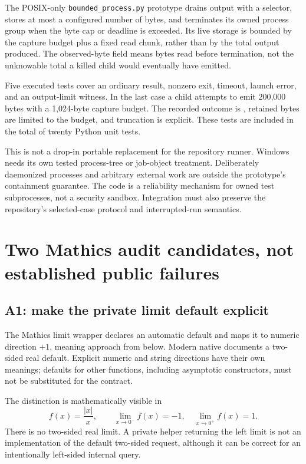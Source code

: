 \documentclass[11pt,letterpaper]{article}
\newcommand{\code}[1]{\texttt{\detokenize{#1}}}
\newcommand{\file}[1]{\nolinkurl{#1}}
\begin{document}
The POSIX-only \file{bounded_process.py} prototype drains output with a selector, stores at most a configured number of bytes, and terminates its owned process group when the byte cap or deadline is exceeded. Its live storage is bounded by the capture budget plus a fixed read chunk, rather than by the total output produced. The observed-byte field means bytes read before termination, not the unknowable total a killed child would eventually have emitted.

Five executed tests cover an ordinary result, nonzero exit, timeout, launch error, and an output-limit witness. In the last case a child attempts to emit 200,000 bytes with a 1,024-byte capture budget. The recorded outcome is \code{OutputLimit}, retained bytes are limited to the budget, and truncation is explicit. These tests are included in the total of twenty Python unit tests.

This is not a drop-in portable replacement for the repository runner. Windows needs its own tested process-tree or job-object treatment. Deliberately daemonized processes and arbitrary external work are outside the prototype's containment guarantee. The code is a reliability mechanism for owned test subprocesses, not a security sandbox. Integration must also preserve the repository's selected-case protocol and interrupted-run semantics.

\section{Two Mathics audit candidates, not established public failures}
\label{sec:audit}

\subsection{A1: make the private limit default explicit}

The Mathics limit wrapper declares an automatic default and maps it to numeric direction $+1$, meaning approach from below. Modern native \code{Limit} documents a two-sided real default. Explicit numeric and string directions have their own meanings; defaults for other functions, including asymptotic constructors, must not be substituted for the \code{Limit} contract.~\cite{msimplify,wllimit}

The distinction is mathematically visible in
\[
 f(x)=\frac{|x|}{x},\qquad
 \lim_{x\to0^-}f(x)=-1,\quad \lim_{x\to0^+}f(x)=1.
\]
There is no two-sided real limit. A private helper returning the left limit is not an implementation of the default two-sided request, although it can be correct for an intentionally left-sided internal query.
\end{document}
